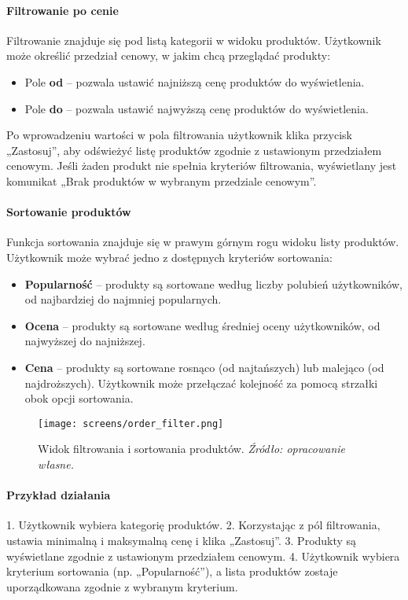\documentclass[12pt,a4paper,oneside]{article}
\theoremstyle{definition}
\numberwithin{equation}{section}
\begin{document}
\paragraph{Filtrowanie po cenie}
Filtrowanie znajduje się pod listą kategorii w widoku produktów. Użytkownik może określić przedział cenowy, w jakim chcą przeglądać produkty:
\begin{itemize}
    \item Pole \textbf{od} – pozwala ustawić najniższą cenę produktów do wyświetlenia.
    \item Pole \textbf{do} – pozwala ustawić najwyższą cenę produktów do wyświetlenia.
\end{itemize}
Po wprowadzeniu wartości w pola filtrowania użytkownik klika przycisk „Zastosuj”, aby odświeżyć listę produktów zgodnie z ustawionym przedziałem cenowym. Jeśli żaden produkt nie spełnia kryteriów filtrowania, wyświetlany jest komunikat „Brak produktów w wybranym przedziale cenowym”.

\paragraph{Sortowanie produktów}
Funkcja sortowania znajduje się w prawym górnym rogu widoku listy produktów. Użytkownik może wybrać jedno z dostępnych kryteriów sortowania:
\begin{itemize}
    \item \textbf{Popularność} – produkty są sortowane według liczby polubień użytkowników, od najbardziej do najmniej popularnych.
    \item \textbf{Ocena} – produkty są sortowane według średniej oceny użytkowników, od najwyższej do najniższej.
    \item \textbf{Cena} – produkty są sortowane rosnąco (od najtańszych) lub malejąco (od najdroższych). Użytkownik może przełączać kolejność za pomocą strzałki obok opcji sortowania.
\end{itemize}

\begin{figure}[H]
    \centering
    \texttt{[image: screens/order\_filter.png]}
    \caption{Widok filtrowania i sortowania produktów. \emph{Źródło: opracowanie własne.}}
    \label{fig:order_filter}
\end{figure}

\paragraph{Przykład działania}
1. Użytkownik wybiera kategorię produktów.
2. Korzystając z pól filtrowania, ustawia minimalną i maksymalną cenę i klika „Zastosuj”.
3. Produkty są wyświetlane zgodnie z ustawionym przedziałem cenowym.
4. Użytkownik wybiera kryterium sortowania (np. „Popularność”), a lista produktów zostaje uporządkowana zgodnie z wybranym kryterium.
\end{document}
